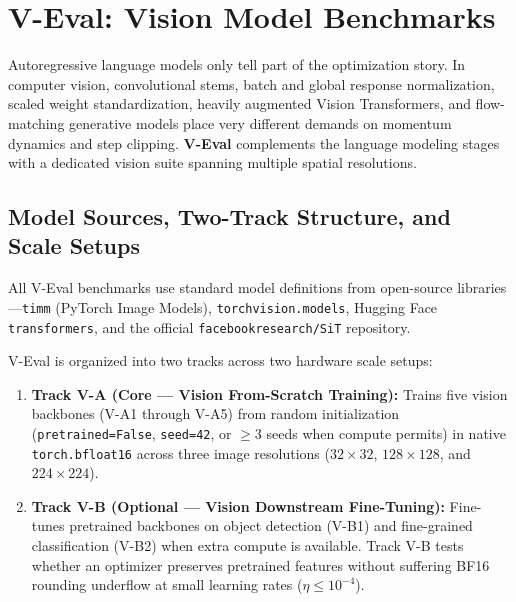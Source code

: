 \documentclass[11pt,a4paper]{article}
\renewcommand{\_}{\origunderscore\allowbreak}
\begin{document}
\section{V-Eval: Vision Model Benchmarks}
\noindent
Autoregressive language models only tell part of the optimization story. In computer vision, convolutional stems, batch and global response normalization, scaled weight standardization, heavily augmented Vision Transformers, and flow-matching generative models place very different demands on momentum dynamics and step clipping. \textbf{V-Eval} complements the language modeling stages with a dedicated vision suite spanning multiple spatial resolutions.

\subsection{Model Sources, Two-Track Structure, and Scale Setups}
\noindent
All V-Eval benchmarks use standard model definitions from open-source libraries---\texttt{timm} (PyTorch Image Models), \texttt{torchvision.models}, Hugging Face \texttt{transformers}, and the official \texttt{facebookresearch/SiT} repository.

V-Eval is organized into two tracks across two hardware scale setups:
\begin{enumerate}[leftmargin=1.8em, itemsep=0.35em]
    \item \textbf{Track V-A (Core --- Vision From-Scratch Training):} Trains five vision backbones (V-A1 through V-A5) from random initialization (\texttt{pretrained=False}, \texttt{seed=42}, or $\ge 3$ seeds when compute permits) in native \texttt{torch.bfloat16} across three image resolutions ($32 \times 32$, $128 \times 128$, and $224 \times 224$).
    \item \textbf{Track V-B (Optional --- Vision Downstream Fine-Tuning):} Fine-tunes pretrained backbones on object detection (V-B1) and fine-grained classification (V-B2) when extra compute is available. Track V-B tests whether an optimizer preserves pretrained features without suffering BF16 rounding underflow at small learning rates ($\eta \le 10^{-4}$).
\end{enumerate}
\end{document}

